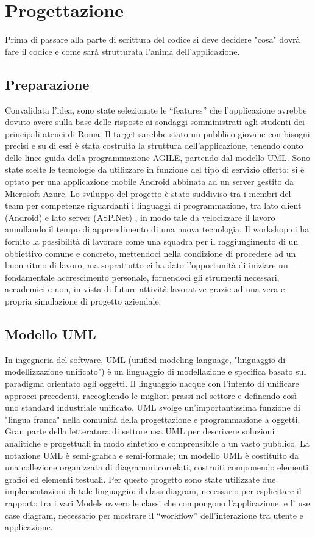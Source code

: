\chapter{Progettazione}
Prima di passare alla parte di scrittura del codice si deve decidere "cosa" dovrà fare il codice e come sarà strutturata l'anima dell'applicazione.

\section{Preparazione}
Convalidata l’idea, sono state selezionate le “features” che l’applicazione avrebbe dovuto avere sulla base delle risposte ai sondaggi somministrati agli studenti dei principali atenei di Roma. Il target sarebbe stato un pubblico giovane con bisogni precisi e su di essi è stata costruita la struttura dell’applicazione, tenendo conto delle linee guida della programmazione AGILE, partendo dal modello UML.
Sono state scelte le tecnologie da utilizzare in funzione del tipo di servizio offerto: si è optato per una applicazione mobile Android abbinata ad un server gestito da Microsoft Azure.
Lo sviluppo del progetto è stato suddiviso tra i membri del team per competenze riguardanti i linguaggi di programmazione, tra lato client (Android) e lato server (ASP.Net) , in modo tale da velocizzare il lavoro annullando il tempo di apprendimento di una nuova tecnologia.
Il workshop ci ha fornito la possibilità di lavorare come una squadra per il raggiungimento di un obbiettivo comune e concreto, mettendoci nella condizione di procedere ad un buon ritmo di lavoro, ma soprattutto ci ha dato l’opportunità di iniziare un fondamentale accrescimento personale, fornendoci gli strumenti necessari, accademici e non, in vista di future attività lavorative grazie ad una vera e propria simulazione di progetto aziendale.

\section{Modello UML}
In ingegneria del software, UML (unified modeling language, "linguaggio di modellizzazione unificato") è un linguaggio di modellazione e specifica basato sul paradigma orientato agli oggetti. Il linguaggio nacque con l'intento di unificare approcci precedenti, raccogliendo le migliori prassi nel settore e definendo così uno standard industriale unificato.
UML svolge un'importantissima funzione di "lingua franca" nella comunità della progettazione e programmazione a oggetti. Gran parte della letteratura di settore usa UML per descrivere soluzioni analitiche e progettuali in modo sintetico e comprensibile a un vasto pubblico.
La notazione UML è semi-grafica e semi-formale; un modello UML è costituito da una collezione organizzata di diagrammi correlati, costruiti componendo elementi grafici ed elementi testuali.
Per questo progetto sono state utilizzate due implementazioni di tale linguaggio: il class diagram, necessario per esplicitare il rapporto tra i vari Models ovvero le classi che compongono l'applicazione, e l’ use case diagram, necessario per mostrare il “workflow” dell’interazione tra utente e applicazione.

